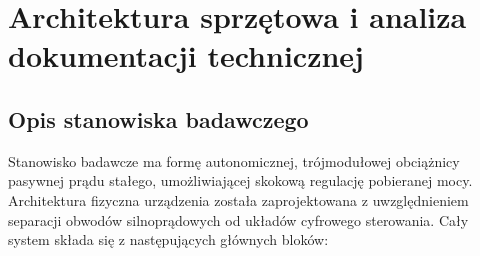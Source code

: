 \chapter{Architektura sprzętowa i analiza dokumentacji technicznej}
\label{chap:analiza_sprzetu}

\section{Opis stanowiska badawczego}
Stanowisko badawcze ma formę autonomicznej, trójmodułowej obciążnicy pasywnej prądu stałego, umożliwiającej skokową regulację pobieranej mocy. Architektura fizyczna urządzenia została zaprojektowana z uwzględnieniem separacji obwodów silnoprądowych od układów cyfrowego sterowania. Cały system składa się z następujących głównych bloków:

